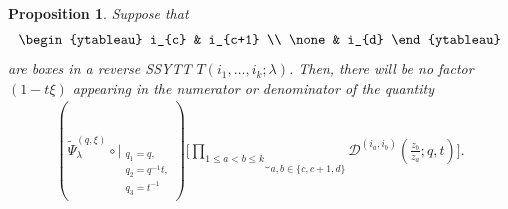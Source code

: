 \documentclass[12pt,reqno,a4paper]{amsart}
\newcommand{\comp}{\circ}
\newcommand{\cals}[1]{\mathcal{#1}}
\numberwithin{equation}{section}
\newtheorem{prop}[thm]{Proposition}
\newcommand{\dualmap}{
\widetilde{\Psi}^{(q,\xi)}_{\lambda}
}
\theoremstyle{definition}
\begin{document}
\begin{prop}
\label{prpa3-1521-27jul}
Suppose that 
\begin{align}
	\begin{ytableau}
		i_{c}  &   i_{c+1} \\
		\none & i_{d}
	\end{ytableau}
	\label{D22-1725-17jan}
\end{align}
are boxes in a reverse SSYTT $T(i_1,\dots,i_k;\lambda)$. Then, there will be no factor $(1 - t\xi)$ appearing in the numerator or denominator of the quantity 
\begin{align}
	(
	\dualmap
	\comp 
	\bigg|_{
		\substack{
			q_1 = q, \\
			q_2 = q^{-1}t,\\
			q_3 = t^{-1} \\
		}
	}
	)
	\Bigg[
	\underbrace{	\prod_{1 \leq a < b \leq k}				}_{a,b \in \{c,c+1,d\}}
	\cals{D}^{(i_a,i_b)}\left(
	\frac{z_b}{z_a}
	; q, t
	\right)
	\Bigg]. 
	\label{A22-eqn-1555-23jan}
\end{align}
\end{prop}
\end{document}
